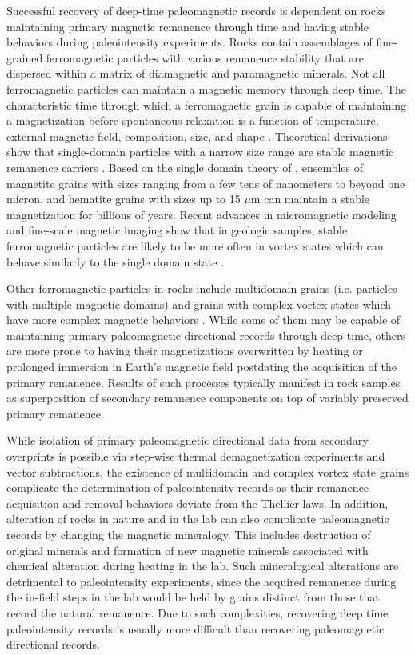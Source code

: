 Successful recovery of deep-time paleomagnetic records is dependent on rocks maintaining primary magnetic remanence through time and having stable behaviors during paleointensity experiments. Rocks contain assemblages of fine-grained ferromagnetic particles with various remanence stability that are dispersed within a matrix of diamagnetic and paramagnetic minerals. Not all ferromagnetic particles can maintain a magnetic memory through deep time. The characteristic time through which a ferromagnetic grain is capable of maintaining a magnetization before spontaneous relaxation is a function of temperature, external magnetic field, composition, size, and shape \citep{Neel1955a, Nagy2017a}. Theoretical derivations show that single-domain particles with a narrow size range are stable magnetic remanence carriers \citep{Butler1975a, Butler1992a}. Based on the single domain theory of \cite{Neel1955a}, ensembles of magnetite grains with sizes ranging from a few tens of nanometers to beyond one micron, and hematite grains with sizes up to 15 $\mu$m can maintain a stable magnetization for billions of years. Recent advances in micromagnetic modeling and fine-scale magnetic imaging show that in geologic samples, stable ferromagnetic particles are likely to be more often in vortex states which can behave similarly to the single domain state \citep{Nagy2017a, Tauxe2020a, CortesOrtuno2022a}. 

Other ferromagnetic particles in rocks include multidomain grains (i.e. particles with multiple magnetic domains) and grains with complex vortex states which have more complex magnetic behaviors \citep{Williams2010a}. While some of them may be capable of maintaining primary paleomagnetic directional records through deep time, others are more prone to having their magnetizations overwritten by heating or prolonged immersion in Earth's magnetic field postdating the acquisition of the primary remanence. Results of such processes typically manifest in rock samples as superposition of secondary remanence components on top of variably preserved primary remanence. 

While isolation of primary paleomagnetic directional data from secondary overprints is possible via step-wise thermal demagnetization experiments and vector subtractions, the existence of multidomain and complex vortex state grains complicate the determination of paleointensity records as their remanence acquisition and removal behaviors deviate from the Thellier laws. In addition, alteration of rocks in nature and in the lab can also complicate paleomagnetic records by changing the magnetic mineralogy. This includes destruction of original minerals and formation of new magnetic minerals associated with chemical alteration during heating in the lab. Such mineralogical alterations are detrimental to paleointensity experiments, since the acquired remanence during the in-field steps in the lab would be held by grains distinct from those that record the natural remanence. Due to such complexities, recovering deep time paleointensity records is usually more difficult than recovering paleomagnetic directional records. 

